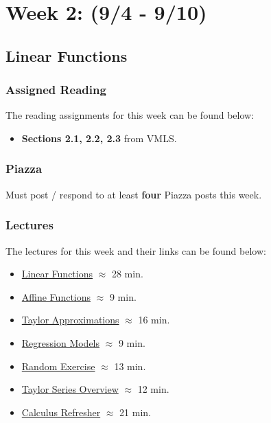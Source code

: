 \clearpage
\chapter{Week 2: (9/4 - 9/10)}

\section{Linear Functions}

\subsection{Assigned Reading}

The reading assignments for this week can be found below:

\begin{itemize}
    \item \textbf{Sections 2.1, 2.2, 2.3} from VMLS.
\end{itemize}

\subsection{Piazza}

Must post / respond to at least \textbf{four} Piazza posts this week.  

\subsection{Lectures}

The lectures for this week and their links can be found below:

\begin{itemize}
    \item \href{https://applied.cs.colorado.edu/mod/hvp/view.php?id=50678}{Linear Functions} $\approx$ 28 min.
    \item \href{https://applied.cs.colorado.edu/mod/hvp/view.php?id=50679}{Affine Functions} $\approx$ 9 min.
    \item \href{https://applied.cs.colorado.edu/mod/hvp/view.php?id=50680}{Taylor Approximations} $\approx$ 16 min.
    \item \href{https://applied.cs.colorado.edu/mod/hvp/view.php?id=50681}{Regression Models} $\approx$ 9 min.
    \item \href{https://applied.cs.colorado.edu/mod/hvp/view.php?id=50682}{Random Exercise} $\approx$ 13 min.
    \item \href{https://www.youtube.com/watch?v=eX1hvWxmJVE}{Taylor Series Overview} $\approx$ 12 min.
    \item \href{https://applied.cs.colorado.edu/mod/hvp/view.php?id=50684}{Calculus Refresher} $\approx$ 21 min.
\end{itemize}

